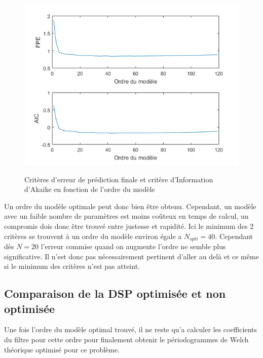 \documentclass[a4paper]{article}
\begin{document}
\begin{figure}[!h]
	\centering
	\includegraphics[scale=0.7]{criteres.png}
    \label{criteres}
    \caption{Critères d'erreur de prédiction finale et critère d'Information d'Akaike en fonction de l'ordre du modèle}
\end{figure}

Un ordre du modèle optimale peut donc bien être obtenu. Cependant, un modèle avec un faible nombre de paramètres est moins coûteux en temps de calcul, un compromis dois donc être trouvé entre justesse et rapidité. Ici le minimum des 2 critères se trouvent à un ordre du modèle environ égale a $N_{opti}=40$. Cependant dès $N=20$ l'erreur commise quand on augmente l'ordre ne semble plus significative. Il n'est donc pas nécessairement pertinent d'aller au delà et ce même si le minimum des critères n'est pas atteint.


\subsection{Comparaison de la DSP optimisée et non optimisée}
Une fois l'ordre du modèle optimal trouvé, il ne reste qu'a calculer les coefficients du filtre pour cette ordre pour finalement obtenir le périodogrammes de Welch théorique optimisé pour ce problème.
\end{document}
